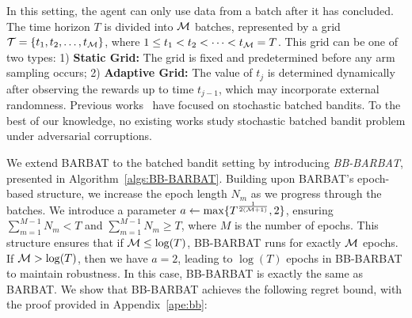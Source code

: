 
In this setting, the agent can only use data from a batch after it has concluded. The time horizon $T$ is divided into ${\mathcal{M}}$ batches, represented by a grid ${\mathcal{T}} = \{t_1, t_2, \dots, t_{{\mathcal{M}}}\}$, where $1 \leq t_1 < t_2 < \cdots < t_{{\mathcal{M}}} = T$. This grid can be one of two types: 1) \textbf{Static Grid:} The grid is fixed and predetermined before any arm sampling occurs; 2) \textbf{Adaptive Grid:} The value of $t_j$ is determined dynamically after observing the rewards up to time $t_{j-1}$, which may incorporate external randomness.
Previous works~\citep{pmlr-v40-Perchet15,gao2019batched,zhang2020inference,esfandiari2021regret,jin2021double} have focused on stochastic batched bandits. To the best of our knowledge, no existing works study  stochastic batched bandit problem under adversarial corruptions.

We extend BARBAT to the batched bandit setting by introducing \emph{BB-BARBAT}, presented in Algorithm~\ref{algs:BB-BARBAT}. Building upon BARBAT's epoch-based structure, we increase the epoch length $N_m$ as we progress through the batches. We introduce a parameter $a \leftarrow \max \{T^{\frac{1}{2({\mathcal{M}}+1)}}, 2\}$, ensuring
$\sum_{m=1}^{M-1}N_m < T$ and $\sum_{m=1}^{M-1}N_m \geq T$,
where $M$ is the number of epochs. This structure ensures that if ${\mathcal{M}} \leq \log(T)$, BB-BARBAT runs for exactly ${\mathcal{M}}$ epochs. If ${\mathcal{M}} > \log(T)$, then we have $a = 2$, leading to $\log(T)$ epochs in BB-BARBAT to maintain robustness. In this  case, BB-BARBAT is exactly the same as BARBAT.
We show that BB-BARBAT achieves the following regret bound, with the proof provided in Appendix~\ref{ape:bb}:

